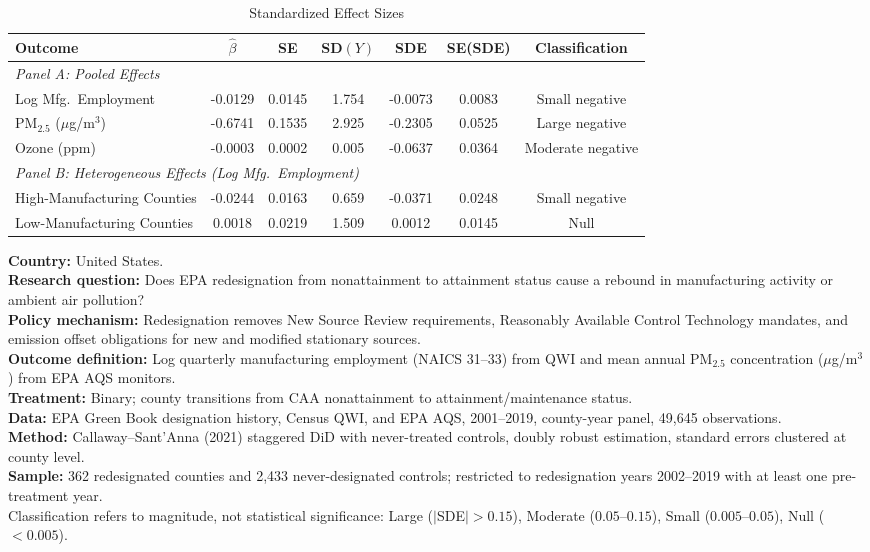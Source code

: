 \begin{table}[t]
\centering
\caption{Standardized Effect Sizes}
\label{tab:sde}
\small
\begin{adjustbox}{max width=\textwidth}
\begin{tabular}{lcccccc}
\toprule
Outcome & $\hat{\beta}$ & SE & SD$(Y)$ & SDE & SE(SDE) & Classification \\
\midrule
\multicolumn{7}{l}{\textit{Panel A: Pooled Effects}} \\[0.3em]
  Log Mfg.\ Employment & -0.0129 & 0.0145 & 1.754 & -0.0073 & 0.0083 & Small negative \\
  PM$_{2.5}$ ($\mu$g/m$^3$) & -0.6741 & 0.1535 & 2.925 & -0.2305 & 0.0525 & Large negative \\
  Ozone (ppm) & -0.0003 & 0.0002 & 0.005 & -0.0637 & 0.0364 & Moderate negative \\
\midrule
\multicolumn{7}{l}{\textit{Panel B: Heterogeneous Effects (Log Mfg.\ Employment)}} \\[0.3em]
  High-Manufacturing Counties & -0.0244 & 0.0163 & 0.659 & -0.0371 & 0.0248 & Small negative \\
  Low-Manufacturing Counties & 0.0018 & 0.0219 & 1.509 & 0.0012 & 0.0145 & Null \\
\bottomrule
\end{tabular}
\end{adjustbox}

\vspace{0.5em}
\begin{minipage}{\textwidth}
\small
\textbf{Country:} United States. \\
\textbf{Research question:} Does EPA redesignation from nonattainment to attainment status cause a rebound in manufacturing activity or ambient air pollution? \\
\textbf{Policy mechanism:} Redesignation removes New Source Review requirements, Reasonably Available Control Technology mandates, and emission offset obligations for new and modified stationary sources. \\
\textbf{Outcome definition:} Log quarterly manufacturing employment (NAICS 31--33) from QWI and mean annual PM$_{2.5}$ concentration ($\mu$g/m$^3$) from EPA AQS monitors. \\
\textbf{Treatment:} Binary; county transitions from CAA nonattainment to attainment/maintenance status. \\
\textbf{Data:} EPA Green Book designation history, Census QWI, and EPA AQS, 2001--2019, county-year panel, 49,645 observations. \\
\textbf{Method:} Callaway--Sant'Anna (2021) staggered DiD with never-treated controls, doubly robust estimation, standard errors clustered at county level. \\
\textbf{Sample:} 362 redesignated counties and 2,433 never-designated controls; restricted to redesignation years 2002--2019 with at least one pre-treatment year. \\[0.5em]
Classification refers to magnitude, not statistical significance: Large ($|$SDE$| > 0.15$), Moderate ($0.05$--$0.15$), Small ($0.005$--$0.05$), Null ($< 0.005$).
\end{minipage}
\end{table}
